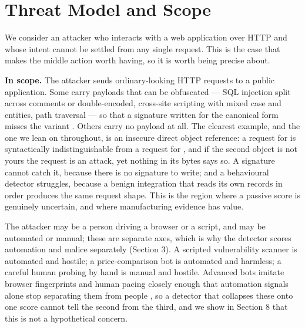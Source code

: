 
\section{Threat Model and Scope}

We consider an attacker who interacts with a web application over HTTP and whose
intent cannot be settled from any single request. This is the case that makes the
middle action worth having, so it is worth being precise about.

\textbf{In scope.} The attacker sends ordinary-looking HTTP requests to a public
application. Some carry payloads that can be obfuscated --- SQL injection split
across comments or double-encoded, cross-site scripting with mixed case and
entities, path traversal --- so that a signature written for the canonical form
misses the variant \cite{amouei2022rat}. Others carry no payload at all. The clearest example, and the
one we lean on throughout, is an insecure direct object reference: a request for
 is syntactically indistinguishable from a request for ,
and if the second object is not yours the request is an attack, yet nothing in its
bytes says so. A signature cannot catch it, because there is no signature to
write; and a behavioural detector struggles, because a benign integration that
reads its own records in order produces the same request shape. This is the region
where a passive score is genuinely uncertain, and where manufacturing evidence has
value.

The attacker may be a person driving a browser or a script, and may be automated
or manual; these are separate axes, which is why the detector scores automation
and malice separately (Section 3). A scripted vulnerability scanner is automated
and hostile; a price-comparison bot is automated and harmless; a careful human
probing by hand is manual and hostile. Advanced bots imitate browser fingerprints and human pacing closely enough that
automation signals alone stop separating them from people \cite{iliou2019towards,iliou2021detection}, so a detector that collapses these onto
one score cannot tell the second from the third, and we show in Section 8 that this is
not a hypothetical concern.

